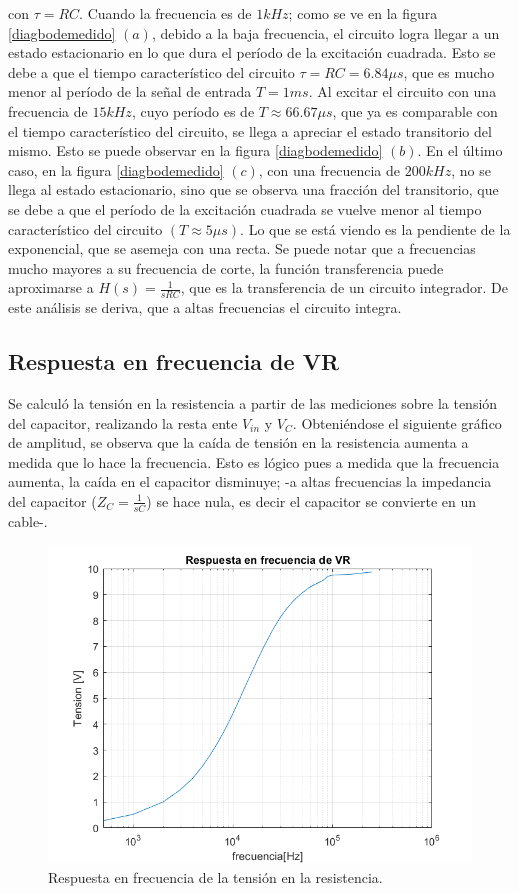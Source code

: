 con $\tau=RC$.
Cuando la frecuencia es de $1kHz$; como se ve en la figura \ref{diagbodemedido} $(a)$, debido a la baja frecuencia, el circuito logra llegar a un estado estacionario en lo que dura el período de la excitación cuadrada. Esto se debe a que el tiempo característico del circuito $\tau=RC=6.84\mu s$, que es mucho menor al período de la señal de entrada $T=1ms$.
Al excitar el circuito con una frecuencia de $15kHz$, cuyo período es de $ T\approx 66.67\mu s$, que ya es comparable con el tiempo característico del circuito, se llega a apreciar el estado transitorio del mismo. Esto se puede observar en la figura \ref{diagbodemedido} $(b)$.
En el último caso, en la figura \ref{diagbodemedido} $(c)$, con una frecuencia de $200kHz$, no se llega al estado estacionario, sino que se observa una fracción del transitorio, que se debe a que el período de la excitación cuadrada se vuelve menor al tiempo característico del circuito $(T\approx 5\mu s)$. Lo que se está viendo es la pendiente de la exponencial, que se asemeja con una recta.
Se puede notar que a frecuencias mucho mayores a su frecuencia de corte, la función transferencia puede aproximarse a $H(s)=\frac{1}{sRC}$, que es la transferencia de un circuito integrador. De este análisis se deriva, que a altas frecuencias el circuito integra.

\subsection{Respuesta en frecuencia de VR}

Se calculó la tensión en la resistencia a partir de las mediciones sobre la tensión del capacitor, realizando la resta ente $V_{in}$ y $V_C$. Obteniéndose el siguiente gráfico de amplitud, se observa que la caída de tensión en la resistencia aumenta a medida que lo hace la frecuencia. Esto es lógico pues a medida que la frecuencia aumenta, la caída en el capacitor disminuye; -a altas frecuencias la impedancia del capacitor ($Z_C=\frac{1}{sC}$) se hace nula, es decir el capacitor se convierte en un cable-.

\begin{figure}[H]
\centering
\includegraphics[scale=0.5]{1-7.png} 
\caption{Respuesta en frecuencia de la tensión en la resistencia.}
\label{rtafrecVR}
\end{figure}

